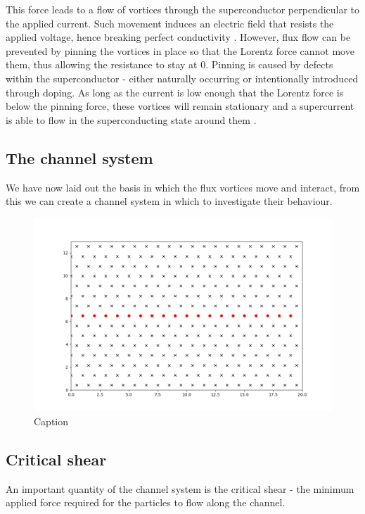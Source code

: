\documentclass{article}
\numberwithin{equation}{section}
\begin{document}
This force leads to a flow of vortices through the superconductor perpendicular to the applied current. Such movement induces an electric field that resists the applied voltage, hence breaking perfect conductivity \cite{Tinkham2004IntroductionSuperconductivity}. However, flux flow can be prevented by pinning the vortices in place so that the Lorentz force cannot move them, thus allowing the resistance to stay at 0. Pinning is caused by defects within the superconductor - either naturally occurring or intentionally introduced through doping. As long as the current is low enough that the Lorentz force is below the pinning force, these vortices will remain stationary and a supercurrent is able to flow in the superconducting state around them \cite{Poole2014Superconductivity}.

\subsection{The channel system}
We have now laid out the basis in which the flux vortices move and interact, from this we can create a channel system in which to investigate their behaviour.

\begin{figure}[htb]
    \centering
    \includegraphics{results/Figures/channel_drawing.gif}
    \caption{Caption}
    \label{fig:my_label}
\end{figure}
 
\subsection{Critical shear}
An important quantity of the channel system is the critical shear - the minimum applied force required for the particles to flow along the channel. 
\end{document}
